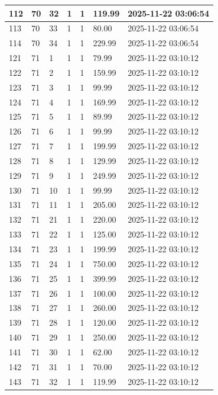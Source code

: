 \begin{longtable}{|l|l|l|l|l|l|l|}
112 & 70 & 32 & 1 & 1 & 119.99 & 2025-11-22 03:06:54 \\ \hline 
113 & 70 & 33 & 1 & 1 & 80.00 & 2025-11-22 03:06:54 \\ \hline 
114 & 70 & 34 & 1 & 1 & 229.99 & 2025-11-22 03:06:54 \\ \hline 
121 & 71 & 1 & 1 & 1 & 79.99 & 2025-11-22 03:10:12 \\ \hline 
122 & 71 & 2 & 1 & 1 & 159.99 & 2025-11-22 03:10:12 \\ \hline 
123 & 71 & 3 & 1 & 1 & 99.99 & 2025-11-22 03:10:12 \\ \hline 
124 & 71 & 4 & 1 & 1 & 169.99 & 2025-11-22 03:10:12 \\ \hline 
125 & 71 & 5 & 1 & 1 & 89.99 & 2025-11-22 03:10:12 \\ \hline 
126 & 71 & 6 & 1 & 1 & 99.99 & 2025-11-22 03:10:12 \\ \hline 
127 & 71 & 7 & 1 & 1 & 199.99 & 2025-11-22 03:10:12 \\ \hline 
128 & 71 & 8 & 1 & 1 & 129.99 & 2025-11-22 03:10:12 \\ \hline 
129 & 71 & 9 & 1 & 1 & 249.99 & 2025-11-22 03:10:12 \\ \hline 
130 & 71 & 10 & 1 & 1 & 99.99 & 2025-11-22 03:10:12 \\ \hline 
131 & 71 & 11 & 1 & 1 & 205.00 & 2025-11-22 03:10:12 \\ \hline 
132 & 71 & 21 & 1 & 1 & 220.00 & 2025-11-22 03:10:12 \\ \hline 
133 & 71 & 22 & 1 & 1 & 125.00 & 2025-11-22 03:10:12 \\ \hline 
134 & 71 & 23 & 1 & 1 & 199.99 & 2025-11-22 03:10:12 \\ \hline 
135 & 71 & 24 & 1 & 1 & 750.00 & 2025-11-22 03:10:12 \\ \hline 
136 & 71 & 25 & 1 & 1 & 399.99 & 2025-11-22 03:10:12 \\ \hline 
137 & 71 & 26 & 1 & 1 & 100.00 & 2025-11-22 03:10:12 \\ \hline 
138 & 71 & 27 & 1 & 1 & 260.00 & 2025-11-22 03:10:12 \\ \hline 
139 & 71 & 28 & 1 & 1 & 120.00 & 2025-11-22 03:10:12 \\ \hline 
140 & 71 & 29 & 1 & 1 & 250.00 & 2025-11-22 03:10:12 \\ \hline 
141 & 71 & 30 & 1 & 1 & 62.00 & 2025-11-22 03:10:12 \\ \hline 
142 & 71 & 31 & 1 & 1 & 70.00 & 2025-11-22 03:10:12 \\ \hline 
143 & 71 & 32 & 1 & 1 & 119.99 & 2025-11-22 03:10:12 \\ \hline 

\end{longtable}
